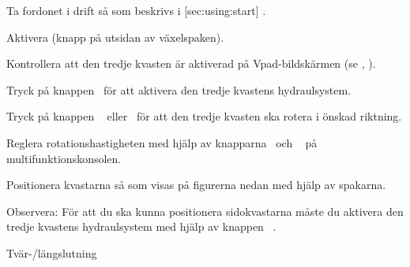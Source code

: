 

\startsection [title={Arbeta med den tredje kvasten (tillval)},
reference={sec:using:frontBrush},
]

\startSteps
\item Ta fordonet i drift så som beskrivs i [sec:using:start]  .
\item Aktivera (knapp på utsidan av växelspaken).
\stopSteps


\startSteps [continue]
\item Kontrollera att den tredje kvasten är aktiverad på Vpad-bildskärmen
(se  , ).
\item Tryck på knappen~ för att aktivera den tredje kvastens hydraulsystem.
\item Tryck på knappen ~ eller~ för att den tredje kvasten ska rotera i önskad riktning.

\item Reglera rotationshastigheten med hjälp av knapparna~ och ~ på multifunktionskonsolen.

\item Positionera kvastarna så som visas på figurerna nedan med hjälp av spakarna.

\stopSteps

{\md Observera:} {\lt För att du ska kunna positionera sidokvastarna måste du aktivera den tredje kvastens hydraulsystem med hjälp av knappen ~.}
\vfill

\start
\setupcombinations [width=\textwidth]

{
{}{Tvär-/längslutning}
\stopcombination}
\stop



\stopsection